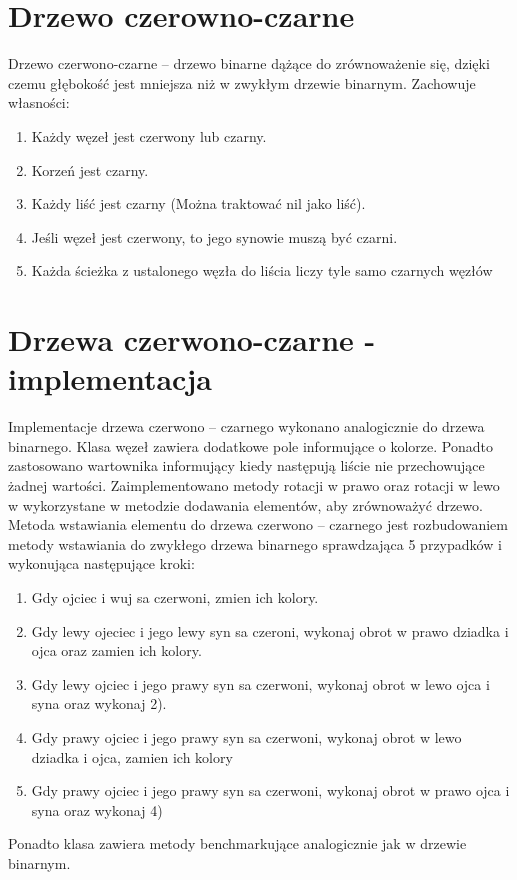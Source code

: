 	\section{Drzewo czerowno-czarne}\label{sec:Drzewo czerowno-czarne}
Drzewo czerwono-czarne – drzewo binarne dążące do zrównoważenie się, dzięki czemu głębokość jest mniejsza niż w zwykłym drzewie binarnym. Zachowuje własności:
\begin{enumerate}
\item	Każdy węzeł jest czerwony lub czarny.
\item	Korzeń jest czarny.
\item	Każdy liść jest czarny (Można traktować nil jako liść).
\item	Jeśli węzeł jest czerwony, to jego synowie muszą być czarni.
\item	Każda ścieżka z ustalonego węzła do liścia liczy tyle samo czarnych węzłów
\end{enumerate}
	
	\section{Drzewa czerwono-czarne - implementacja}\label{sec:Drzewa czerwono-czarne - implementacja}
	Implementacje drzewa czerwono – czarnego wykonano analogicznie do drzewa binarnego. Klasa węzeł zawiera dodatkowe pole informujące o kolorze. Ponadto zastosowano wartownika informujący kiedy następują liście nie przechowujące żadnej wartości. Zaimplementowano metody rotacji w prawo oraz rotacji w lewo w wykorzystane w metodzie dodawania elementów, aby zrównoważyć drzewo. Metoda wstawiania elementu do drzewa czerwono – czarnego jest rozbudowaniem metody wstawiania do zwykłego drzewa binarnego sprawdzająca 5 przypadków i wykonująca następujące kroki:
	\begin{enumerate}
	\item Gdy ojciec i wuj sa czerwoni, zmien ich kolory.
	\item Gdy lewy ojeciec i jego lewy syn sa czeroni, wykonaj obrot w prawo dziadka i ojca oraz zamien ich kolory.
	\item Gdy lewy ojciec i jego prawy syn sa czerwoni, wykonaj obrot w lewo ojca i syna oraz wykonaj 2).
	\item Gdy prawy ojciec i jego prawy syn sa czerwoni, wykonaj obrot w lewo  dziadka i ojca, zamien ich kolory
	\item Gdy prawy ojciec i jego prawy syn sa czerwoni, wykonaj obrot w prawo ojca i syna oraz wykonaj 4)
	\end{enumerate}
	Ponadto klasa zawiera metody benchmarkujące analogicznie jak w drzewie binarnym.
	
